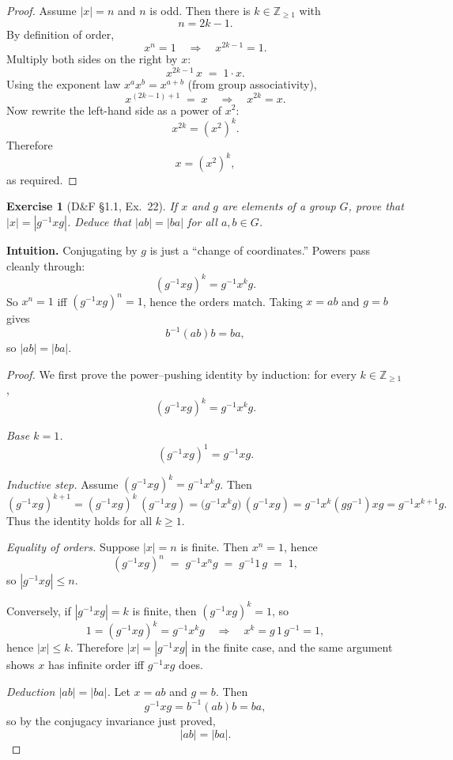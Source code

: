 \documentclass[12pt]{article}
\newtheorem{exercise}[theorem]{Exercise}
\theoremstyle{definition}
\begin{document}
\dotfill

\begin{proof}
Assume $|x|=n$ and $n$ is odd. Then there is $k\in\mathbb{Z}_{\ge 1}$ with
\[
n=2k-1.
\]
By definition of order,
\[
x^n=1 \quad\Longrightarrow\quad x^{2k-1}=1.
\]
Multiply both sides on the right by $x$:
\[
x^{2k-1}\,x \;=\; 1\cdot x.
\]
Using the exponent law $x^a x^b=x^{a+b}$ (from group associativity),
\[
x^{(2k-1)+1} \;=\; x
\quad\Longrightarrow\quad
x^{2k}=x.
\]
Now rewrite the left-hand side as a power of $x^2$:
\[
x^{2k}=(x^2)^k.
\]
Therefore
\[
x=(x^2)^k,
\]
as required.
\end{proof}

\newpage

\begin{exercise}[D\&F §1.1, Ex.~22]
If $x$ and $g$ are elements of a group $G$, prove that $|x|=|g^{-1}xg|$.
Deduce that $|ab|=|ba|$ for all $a,b\in G$.
\end{exercise}

\dotfill

\noindent
\textbf{Intuition.}
Conjugating by $g$ is just a “change of coordinates.” Powers pass cleanly through:
\[
(g^{-1}xg)^k=g^{-1}x^k g.
\]
So $x^n=1$ iff $(g^{-1}xg)^n=1$, hence the orders match. Taking $x=ab$ and $g=b$ gives
\[
b^{-1}(ab)b=ba,
\]
so $|ab|=|ba|$.

\dotfill

\begin{proof}
We first prove the power–pushing identity by induction: for every $k\in\mathbb{Z}_{\ge 1}$,
\[
(g^{-1}xg)^k=g^{-1}x^k g.
\]

\noindent\emph{Base $k=1$.}
\[
(g^{-1}xg)^1=g^{-1}xg.
\]

\noindent\emph{Inductive step.}
Assume $(g^{-1}xg)^k=g^{-1}x^k g$.
Then
\[
(g^{-1}xg)^{k+1}=(g^{-1}xg)^k\,(g^{-1}xg)
= \bigl(g^{-1}x^k g\bigr)\,(g^{-1}xg)
= g^{-1}x^k(gg^{-1})xg
= g^{-1}x^{k+1}g.
\]
Thus the identity holds for all $k\ge 1$.

\dotfill

\noindent\emph{Equality of orders.}
Suppose $|x|=n$ is finite. Then $x^n=1$, hence
\[
(g^{-1}xg)^n \;=\; g^{-1}x^n g \;=\; g^{-1}1\,g \;=\; 1,
\]
so $|g^{-1}xg|\le n$.

Conversely, if $|g^{-1}xg|=k$ is finite, then $(g^{-1}xg)^k=1$, so
\[
1=(g^{-1}xg)^k=g^{-1}x^k g
\quad\Longrightarrow\quad
x^k = g\,1\,g^{-1}=1,
\]
hence $|x|\le k$. Therefore $|x|=|g^{-1}xg|$ in the finite case, and the same argument shows
$x$ has infinite order iff $g^{-1}xg$ does.

\dotfill

\noindent\emph{Deduction $|ab|=|ba|$.}
Let $x=ab$ and $g=b$. Then
\[
g^{-1}xg=b^{-1}(ab)b=ba,
\]
so by the conjugacy invariance just proved,
\[
|ab|=|ba|.
\]
\end{proof}
\end{document}
